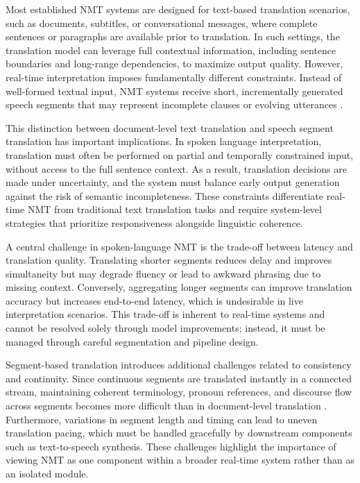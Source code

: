 Most established NMT systems are designed for text-based translation scenarios, such as documents, subtitles, or conversational messages, where complete sentences or paragraphs are available prior to translation. In such settings, the translation model can leverage full contextual information, including sentence boundaries and long-range dependencies, to maximize output quality. However, real-time interpretation imposes fundamentally different constraints. Instead of well-formed textual input, NMT systems receive short, incrementally generated speech segments that may represent incomplete clauses or evolving utterances \cite{chen2024metamorphosisMT}.

This distinction between document-level text translation and speech segment translation has important implications. In spoken language interpretation, translation must often be performed on partial and temporally constrained input, without access to the full sentence context. As a result, translation decisions are made under uncertainty, and the system must balance early output generation against the risk of semantic incompleteness. These constraints differentiate real-time NMT from traditional text translation tasks and require system-level strategies that prioritize responsiveness alongside linguistic coherence.

A central challenge in spoken-language NMT is the trade-off between latency and translation quality. Translating shorter segments reduces delay and improves simultaneity but may degrade fluency or lead to awkward phrasing due to missing context. Conversely, aggregating longer segments can improve translation accuracy but increases end-to-end latency, which is undesirable in live interpretation scenarios. This trade-off is inherent to real-time systems and cannot be resolved solely through model improvements; instead, it must be managed through careful segmentation and pipeline design.

Segment-based translation introduces additional challenges related to consistency and continuity. Since continuous segments are translated instantly in a connected stream, maintaining coherent terminology, pronoun references, and discourse flow across segments becomes more difficult than in document-level translation \cite{dhawan2022speech2speechchallenges}. Furthermore, variations in segment length and timing can lead to uneven translation pacing, which must be handled gracefully by downstream components such as text-to-speech synthesis. These challenges highlight the importance of viewing NMT as one component within a broader real-time system rather than as an isolated module.

